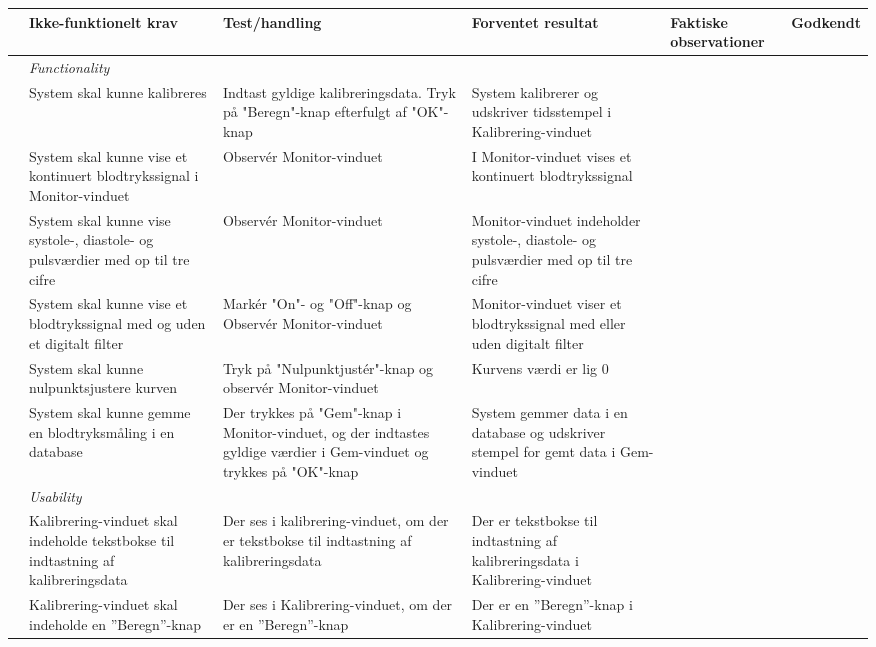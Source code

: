 \begin{longtabu} to 
	& Ikke-funktionelt krav & Test/handling & Forventet resultat & Faktiske observationer & Godkendt
	\\[-1ex] \midrule
	&  \textit{Functionality} &  &  & & \\ \midrule
	& System skal kunne kalibreres & Indtast gyldige kalibreringsdata. Tryk på "Beregn"\--knap efterfulgt af "OK"\--knap & System kalibrerer og udskriver tidsstempel i Kalibrering-vinduet &  & %
	\\ \midrule
	& System skal kunne vise et kontinuert blodtrykssignal i Monitor-vinduet & Observér Monitor-vinduet & I Monitor-vinduet vises et kontinuert blodtrykssignal &  & %
	\\ \midrule
	& System skal kunne vise systole-, diastole- og pulsværdier med op til tre cifre & Observér Monitor-vinduet & Monitor-vinduet indeholder systole-, diastole- og pulsværdier med op til tre cifre &  & %
	\\ \midrule
	& System skal kunne vise et blodtrykssignal med og uden et digitalt filter & Markér "On"- og "Off"\--knap og Observér Monitor-vinduet & Monitor-vinduet viser et blodtrykssignal med eller uden digitalt filter &  & %
	\\ \midrule
	& System skal kunne nulpunktsjustere kurven & Tryk på "Nulpunktjustér"\--knap og observér Monitor-vinduet & Kurvens værdi er lig 0 &  & %
	\\ \midrule
	& System skal kunne gemme en blodtryksmåling i en database & Der trykkes på "Gem"\--knap i Monitor-vinduet, og der indtastes gyldige værdier i Gem-vinduet og trykkes på "OK"\--knap & System gemmer data i en database og udskriver stempel for gemt data i Gem-vinduet &  & %
	\\ \midrule
	& \textit{Usability} &  &  & & \\ \midrule
	& Kalibrering-vinduet skal indeholde tekstbokse til indtastning af kalibreringsdata & Der ses i kalibrering-vinduet, om der er tekstbokse til indtastning af kalibreringsdata & Der er tekstbokse til indtastning af kalibreringsdata i Kalibrering-vinduet &  & %
	\\ \midrule
	& Kalibrering-vinduet skal indeholde en ”Beregn”\--knap & Der ses i Kalibrering-vinduet, om der er en ”Beregn”\--knap & Der er en ”Beregn”\--knap i Kalibrering-vinduet &  & %
	\\ \midrule

\end{longtabu}
